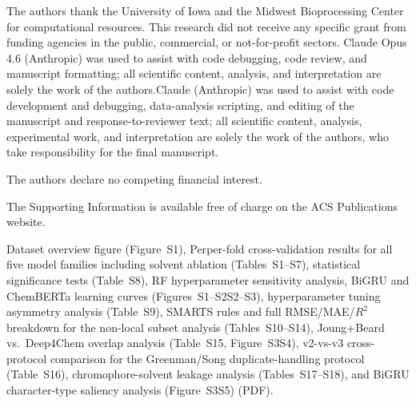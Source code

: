 \documentclass[journal=jcisd8,manuscript=article]{achemso}
\newcommand{\added}[1]{{\color{addedblue}#1}}
\newcommand{\removed}[1]{{\color{removedred}#1}}
\newcommand{\addedii}[1]{{\color{addedgreen}#1}}
\newcommand{\removedii}[1]{{\color{removedorange}#1}}
\begin{document}
\begin{acknowledgement}
The authors thank the University of Iowa and the Midwest Bioprocessing Center for computational resources.
This research did not receive any specific grant from funding agencies in the public, commercial, or not-for-profit sectors.
\removedii{Claude Opus 4.6 (Anthropic) was used to assist with code debugging, code review, and manuscript formatting; all scientific content, analysis, and interpretation are solely the work of the authors.}\addedii{Claude (Anthropic) was used to assist with code development and debugging, data-analysis scripting, and editing of the manuscript and response-to-reviewer text; all scientific content, analysis, experimental work, and interpretation are solely the work of the authors, who take responsibility for the final manuscript.}
\end{acknowledgement}

The authors declare no competing financial interest.

\begin{suppinfo}
The Supporting Information is available free of charge on the ACS Publications website.

\added{Dataset overview figure (Figure~S1),} \removed{Per}\added{per}-fold cross-validation results for all five model families including solvent ablation (Tables~S1--S7), statistical significance tests (Table~S8), RF hyperparameter sensitivity analysis, BiGRU and ChemBERTa learning curves (Figures~\removed{S1--S2}\added{S2--S3}), hyperparameter tuning asymmetry analysis (Table~S9), \added{SMARTS rules and full RMSE/MAE/$R^2$ breakdown for the non-local subset analysis (Tables~S10--S14),} \added{Joung+Beard vs.\ Deep4Chem overlap analysis (Table~S15, Figure~\removed{S3}\added{S4}),} \added{v2-vs-v3 cross-protocol comparison for the Greenman/Song duplicate-handling protocol (Table~S16),} \added{chromophore-solvent leakage analysis (Tables~S17--S18),} and BiGRU character-type saliency analysis (Figure~\removed{S3}\added{S5}) (PDF).
\end{suppinfo}


\end{document}
